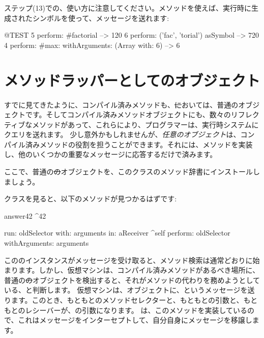 \documentclass[a4paper,10pt,twoside]{book}
\begin{document}
ステップ(13)での、使い方に注意してください。メソッドを使えば、実行時に生成されたシンボルを使って、メッセージを送れます:
\begin{code}{@TEST}
5 perform: #factorial                                             --> 120
6 perform: ('fac', 'torial') asSymbol                       --> 720
4 perform: #max: withArguments: (Array with: 6) --> 6
\end{code}

\section{メソッドラッパーとしてのオブジェクト}

すでに見てきたように、コンパイル済みメソッドも、\st においては、普通のオブジェクトです。そしてコンパイル済みメソッドオブジェクトにも、数々のリフレクティブなメソッドがあって、これらにより、プログラマーは、実行時システムにクエリを送れます。
少し意外かもしれませんが、\emph{任意のオブジェクト}は、コンパイル済みメソッドの役割を担うことができます。それには、メソッドを実装し、他のいくつかの重要なメッセージに応答するだけで済みます。


ここで、普通の\st のオブジェクトを、このクラスのメソッド辞書にインストールしましょう。


クラスを見ると、以下のメソッドが見つかるはずです:
\begin{code}{}
answer42
	^42

run: oldSelector with: arguments in: aReceiver
	^self perform: oldSelector withArguments: arguments
\end{code}

こののインスタンスがメッセージを受け取ると、メソッド検索は通常どおりに始まります。しかし、仮想マシンは、コンパイル済みメソッドがあるべき場所に、普通の\st のオブジェクトを検出すると、それがメソッドの代わりを務めようとしている、と判断します。
仮想マシンは、オブジェクトに、というメッセージを送ります。このとき、もともとのメソッドセレクターと、もともとの引数と、もともとのレシーバーが、の引数になります。
は、このメソッドを実装しているので、これはメッセージをインターセプトして、自分自身にメッセージを移譲します。
\end{document}
